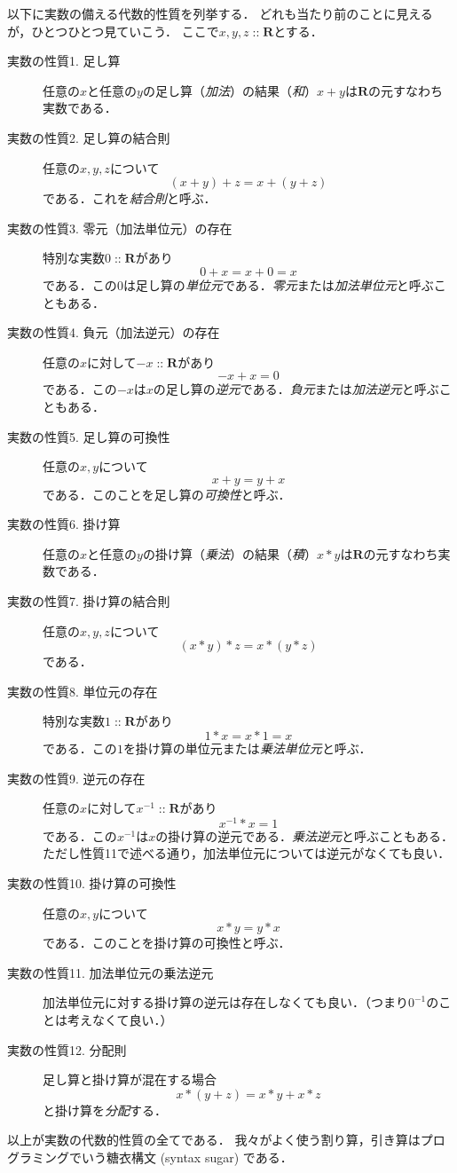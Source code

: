 \documentclass[twocolumn]{jsbook}
\DeclareMathOperator{\mathIn}{::}
\newcommand{\mathSet}[1]{\mathbf{#1}}
\newcommand{\keyword}[1]{\emph{#1}}
\begin{document}
以下に実数の備える代数的性質を列挙する．
どれも当たり前のことに見えるが，ひとつひとつ見ていこう．
ここで$x,y,z\mathIn\mathSet{R}$とする．
\begin{description}
\item[実数の性質1. 足し算] 任意の$x$と任意の$y$の足し算（\keyword{加法}）の結果（\keyword{和}）$x+y$は$\mathSet{R}$の元すなわち実数である．
\item[実数の性質2. 足し算の結合則] 任意の$x,y,z$について$$(x+y)+z=x+(y+z)$$である．これを\keyword{結合則}と呼ぶ．
\item[実数の性質3. 零元（加法単位元）の存在] 特別な実数$0\mathIn\mathSet{R}$があり$$0+x=x+0=x$$である．この$0$は足し算の\keyword{単位元}である．\keyword{零元}または\keyword{加法単位元}と呼ぶこともある．
\item[実数の性質4. 負元（加法逆元）の存在] 任意の$x$に対して$-x\mathIn\mathSet{R}$があり$$-x+x=0$$である．この$-x$は$x$の足し算の\keyword{逆元}である．\keyword{負元}または\keyword{加法逆元}と呼ぶこともある．
\item[実数の性質5. 足し算の可換性] 任意の$x,y$について$$x+y=y+x$$である．このことを足し算の\keyword{可換性}と呼ぶ．
\item[実数の性質6. 掛け算] 任意の$x$と任意の$y$の掛け算（\keyword{乗法}）の結果（\keyword{積}）$x*y$は$\mathSet{R}$の元すなわち実数である．
\item[実数の性質7. 掛け算の結合則] 任意の$x,y,z$について$$(x*y)*z=x*(y*z)$$である．
\item[実数の性質8. 単位元の存在] 特別な実数$1\mathIn\mathSet{R}$があり$$1*x=x*1=x$$である．この$1$を掛け算の単位元または\keyword{乗法単位元}と呼ぶ．
\item[実数の性質9. 逆元の存在] 任意の$x$に対して$x^{-1}\mathIn\mathSet{R}$があり$$x^{-1}*x=1$$である．この$x^{-1}$は$x$の掛け算の逆元である．\keyword{乗法逆元}と呼ぶこともある．ただし性質11で述べる通り，加法単位元については逆元がなくても良い．
\item[実数の性質10. 掛け算の可換性] 任意の$x,y$について$$x*y=y*x$$である．このことを掛け算の可換性と呼ぶ．
\item[実数の性質11. 加法単位元の乗法逆元] 加法単位元に対する掛け算の逆元は存在しなくても良い．（つまり$0^{-1}$のことは考えなくて良い．）
\item[実数の性質12. 分配則] 足し算と掛け算が混在する場合$$x*(y+z)=x*y+x*z$$と掛け算を\keyword{分配}する．
\end{description}
以上が実数の代数的性質の全てである．
我々がよく使う割り算，引き算はプログラミングでいう糖衣構文 (syntax sugar) である．
\end{document}
